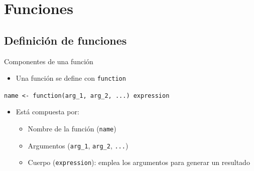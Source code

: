 \documentclass[xcolor={usenames,svgnames,dvipsnames}]{beamer}
\begin{document}
\section{Funciones}
\label{sec:org9d31787}
\subsection{Definición de funciones}
\label{sec:org6c45123}
\begin{frame}[fragile,label={sec:org2792f02}]{Componentes de una función}
 \begin{itemize}
\item Una función se define con \texttt{function}
\end{itemize}
\begin{center}
\texttt{name <- function(arg\_1, arg\_2, ...) expression}
\end{center}
\begin{itemize}
\item Está compuesta por:
\begin{itemize}
\item Nombre de la función (\texttt{name})
\item Argumentos (\texttt{arg\_1}, \texttt{arg\_2}, \texttt{...})
\item Cuerpo (\texttt{expression}): emplea los argumentos para generar un resultado
\end{itemize}
\end{itemize}
\end{frame}
\end{document}
